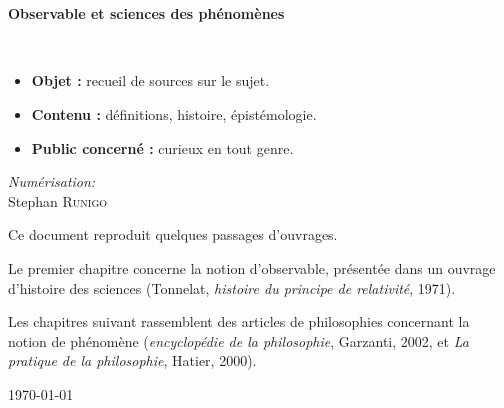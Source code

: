 \begin{titlepage}
%
~\\[1cm]

\begin{center}
\end{center}

\textsc{\Large }\\[0.5cm]

\HRule

\begin{center}
{\huge \bfseries  Observable et sciences des phénomènes\\ }
 
\end{center}

\HRule \\[1.5cm]

\vspace{1cm}
\begin{itemize}[leftmargin=1cm, label=, itemsep=2pt]
\item {\bf Objet :} recueil de sources sur le sujet.
\item {\bf Contenu :} définitions, histoire, épistémologie.
\item {\bf Public concerné :} curieux en tout genre.
\end{itemize}
\vspace{2cm}


\begin{minipage}{0.4\textwidth}
\begin{flushleft} \large
\end{flushleft}
\end{minipage}
\begin{minipage}{0.4\textwidth}
\begin{flushright} \large
\emph{Numérisation:}\\
Stephan \textsc{Runigo}
\end{flushright}
\end{minipage}

\vspace{2.5cm}

Ce document reproduit quelques passages d'ouvrages.

\vfill

Le premier chapitre concerne la notion d'observable, présentée dans un ouvrage d'histoire des sciences ({\sc Tonnelat}, {\it histoire du principe de relativité}, 1971).

\vfill

Les chapitres suivant rassemblent des articles de philosophies concernant la notion de phénomène ({\it encyclopédie de la philosophie}, {\sc Garzanti}, 2002, et {\it La pratique de la philosophie}, {\sc Hatier}, 2000).

\vspace{1.5cm}

{\large \today}

\end{titlepage}
